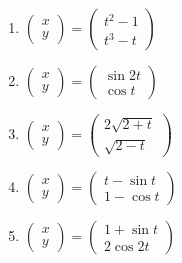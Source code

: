 \begin{ueb}
\begin{enumerate}
\begin{enumerate}
                  \item \(\begin{pmatrix}
                            x \\
                            y
                        \end{pmatrix} = \begin{pmatrix}
                            t^2 - 1 \\
                            t^3 - t
                        \end{pmatrix}\)

                  \item \(\begin{pmatrix}
                            x \\
                            y
                        \end{pmatrix} = \begin{pmatrix}
                            \sin 2t \\
                            \cos t
                        \end{pmatrix}\)

                  \item \(\begin{pmatrix}
                            x \\
                            y
                        \end{pmatrix} = \begin{pmatrix}
                            2\sqrt{2 + t} \\
                            \sqrt{2 - t}
                        \end{pmatrix}\)

                  \item \(\begin{pmatrix}
                            x \\
                            y
                        \end{pmatrix} = \begin{pmatrix}
                            t - \sin t \\
                            1 - \cos t
                        \end{pmatrix}\)

                  \item \(\begin{pmatrix}
                            x \\
                            y
                        \end{pmatrix} = \begin{pmatrix}
                            1 + \sin t \\
                            2 \cos 2t
                        \end{pmatrix}\)


\end{enumerate}
\end{enumerate}
\end{ueb}
